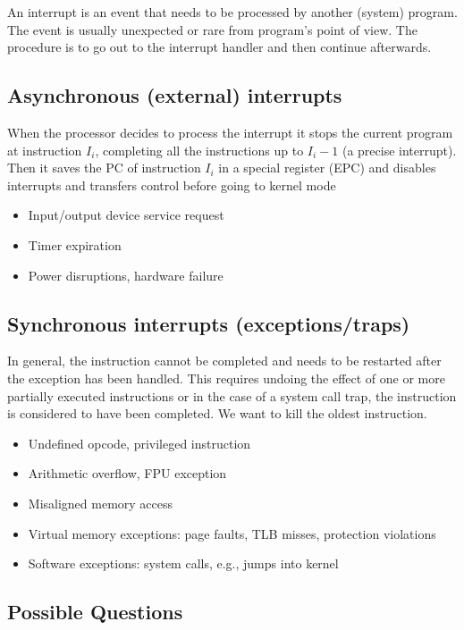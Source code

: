 \documentclass{article}
\begin{document}
An interrupt is an event that needs to be processed by another (system) program. The event is usually unexpected or rare from program’s point of view. The procedure is to go out to the interrupt handler and then continue afterwards.

\subsection{Asynchronous (external) interrupts}

When the processor decides to process the 
interrupt it stops the current program at instruction $I_i$, completing all the instructions up to $I_i-1$ (a precise interrupt). Then it saves the PC of instruction $I_i$ in a special register (EPC) and disables interrupts and transfers control before going to kernel mode

\begin{itemize}
\item Input/output device service request 
\item Timer expiration
\item Power disruptions, hardware failure
\end{itemize}

\subsection{Synchronous interrupts (exceptions/traps)}

In general, the instruction cannot be completed and 
needs to be restarted after the exception has been handled. This requires undoing the effect of one or more partially executed instructions or in the case of a system call trap, the instruction is considered to have been completed. We want to kill the oldest instruction.

\begin{itemize}
\item Undefined opcode, privileged instruction 
\item Arithmetic overflow, FPU exception 
\item Misaligned memory access  
\item Virtual memory exceptions: page faults, TLB misses, protection violations 
\item Software exceptions: system calls, e.g., jumps into kernel  
\end{itemize}

\subsection{Possible Questions}
\end{document}
